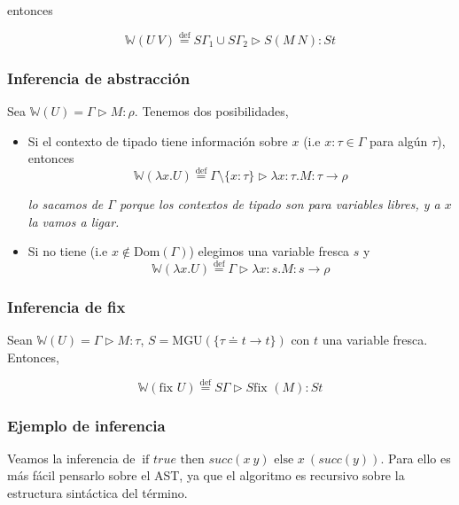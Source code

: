 \documentclass{report}
\theoremstyle{definition} %
\newcommand{\eqdef}{\overset{\text{def}}{=}}
\newcommand{\tfunc}[2]{#1 \to #2}
\newcommand{\ifte}[3]{\ \text{if } #1 \text{ then } #2 \text{ else } #3}
\newcommand{\abs}[3]{\lambda #1 : #2 . #3}
\newcommand{\app}[2]{#1 \ #2} %
\newcommand{\uabs}[2]{\lambda #1 . #2} %
\newcommand{\tipa}[3]{#1 \rhd #2 : #3} %
\newcommand{\tienetipo}[3]{#1 : #2 \in #3}
\newcommand{\Gtipa}[2]{\tipa{\Gamma}{#1}{#2}}
\newcommand{\suc}[1]{succ(#1)}
\newcommand{\fix}[1]{\text{fix } #1}
\newcommand{\tsust}[1]{S#1} %
\newcommand{\infer}[1]{\mathbb{W}(#1)}
\newcommand{\unify}[2]{#1 \doteq #2}
\newcommand{\mgu}[2]{\text{MGU}(\{ \unify{#1}{#2} \})}
\begin{document}
entonces

\[
    \infer{\app{U}{V}} \eqdef
    \tipa
        {\tsust{\Gamma_1} \cup \tsust{\Gamma_2}}
        {\tsust{(\app{M}{N})}}
        {\tsust{t}}
\]

\subsubsection{Inferencia de abstracción}

Sea $\infer{U} = \Gtipa{M}{\rho}$. Tenemos dos posibilidades,

\begin{itemize}
    \item Si el contexto de tipado tiene información sobre $x$
    (i.e $\tienetipo{x}{\tau}{\Gamma}$ para algún $\tau$), entonces
    \[
        \infer{\uabs{x}{U}} \eqdef
        \tipa
            {\Gamma \setminus \{ x: \tau\}}
            {\abs{x}{\tau}{M}}
            {\tfunc{\tau}{\rho}}
    \]

    \textit{lo sacamos de $\Gamma$ porque los contextos de tipado son para variables libres, y a $x$ la vamos a ligar.}

    \item Si no tiene (i.e $x \notin \text{Dom}({\Gamma})$) elegimos una
    variable fresca $s$ y
    \[
        \infer{\uabs{x}{U}} \eqdef
        \Gtipa
            {\abs{x}{s}{M}}
            {\tfunc{s}{\rho}}
    \]
\end{itemize}

\subsubsection{Inferencia de fix}

Sean $\infer{U} = \Gtipa{M}{\tau}$, $S = \mgu{\tau}{\tfunc{t}{t}}$ con $t$ una
variable fresca. Entonces,

\[
    \infer{\fix{U}} \eqdef
    \tipa
        {\tsust{\Gamma}}
        {\tsust{\fix{(M)}}}
        {\tsust{t}}
\]

\subsubsection{Ejemplo de inferencia}

Veamos la inferencia de $\ifte{true}{\suc{\app{x}{y}}}{\app{x}{(\suc{y})}}$.
Para ello es más fácil pensarlo sobre el AST, ya que el algoritmo es recursivo
sobre la estructura sintáctica del término.
\end{document}
